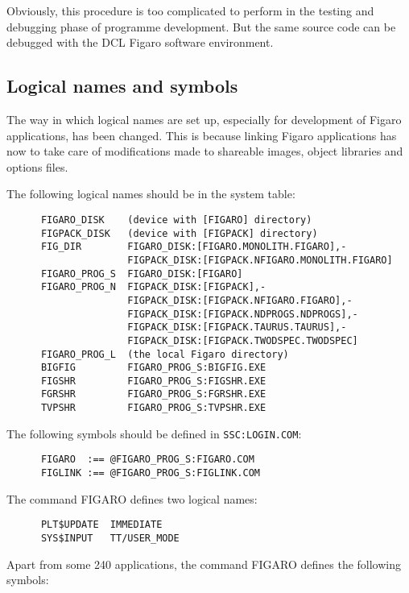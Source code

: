Obviously, this procedure is too complicated to perform in the testing and
debugging phase of programme development. But the same source code can be
debugged with the DCL Figaro software environment.

\subsection{Logical names and symbols}
\label{names}

The way in which logical names are set up, especially for development of Figaro
applications, has been changed. This is because linking Figaro applications has
now to take care of modifications made to shareable images, object libraries
and options files.

The following logical names should be in the system table:

\begin{verbatim}
      FIGARO_DISK    (device with [FIGARO] directory)
      FIGPACK_DISK   (device with [FIGPACK] directory)
      FIG_DIR        FIGARO_DISK:[FIGARO.MONOLITH.FIGARO],-
                     FIGPACK_DISK:[FIGPACK.NFIGARO.MONOLITH.FIGARO]
      FIGARO_PROG_S  FIGARO_DISK:[FIGARO]
      FIGARO_PROG_N  FIGPACK_DISK:[FIGPACK],-
                     FIGPACK_DISK:[FIGPACK.NFIGARO.FIGARO],-
                     FIGPACK_DISK:[FIGPACK.NDPROGS.NDPROGS],-
                     FIGPACK_DISK:[FIGPACK.TAURUS.TAURUS],-
                     FIGPACK_DISK:[FIGPACK.TWODSPEC.TWODSPEC]
      FIGARO_PROG_L  (the local Figaro directory)
      BIGFIG         FIGARO_PROG_S:BIGFIG.EXE
      FIGSHR         FIGARO_PROG_S:FIGSHR.EXE
      FGRSHR         FIGARO_PROG_S:FGRSHR.EXE
      TVPSHR         FIGARO_PROG_S:TVPSHR.EXE
\end{verbatim}

The following symbols should be defined in {\tt SSC:LOGIN.COM}:

\begin{verbatim}
      FIGARO  :== @FIGARO_PROG_S:FIGARO.COM
      FIGLINK :== @FIGARO_PROG_S:FIGLINK.COM
\end{verbatim}

The command FIGARO defines two logical names:

\begin{verbatim}
      PLT$UPDATE  IMMEDIATE
      SYS$INPUT   TT/USER_MODE
\end{verbatim}

Apart from some 240 applications, the command FIGARO defines the following
symbols:
  
